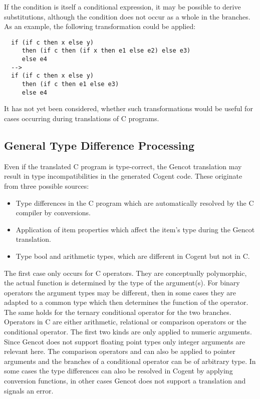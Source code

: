 If the condition is itself a conditional expression, it may be possible to derive substitutions, although the condition does
not occur as a whole in the branches. As an example, the following transformation could be applied:
\begin{verbatim}
  if (if c then x else y) 
     then (if c then (if x then e1 else e2) else e3) 
     else e4 
  -->
  if (if c then x else y) 
     then (if c then e1 else e3)
     else e4
\end{verbatim}
It has not yet been considered, whether such transformations would be useful for cases occurring during translations of C programs.

\subsection{General Type Difference Processing}
\label{impl-post-types}

Even if the translated C program is type-correct, the Gencot translation may result in type incompatibilities in the generated
Cogent code. These originate from three possible sources:
\begin{itemize}
\item Type differences in the C program which are automatically resolved by the C compiler by conversions.
\item Application of item properties which affect the item's type during the Gencot translation.
\item Type bool and arithmetic types, which are different in Cogent but not in C.
\end{itemize}

The first case only occurs for C operators. They are conceptually polymorphic, the actual function is determined by the type
of the argument(s). For binary operators the argument types may be different, then in some cases they are adapted to a common
type which then determines the function of the operator. The same holds for the ternary conditional operator for the two
branches. Operators in C are either arithmetic, relational or comparison operators or the conditional operator. The first
two kinds are only applied to numeric arguments. Since Gencot does not support floating point types only integer arguments
are relevant here. The comparison operators \code{==} and \code{!=} can also be applied to pointer arguments and the branches
of a conditional operator can be of arbitrary type. In some cases the type differences can also be resolved in Cogent by
applying conversion functions, in other cases Gencot does not support a translation and signals an error.

